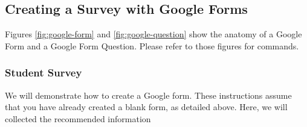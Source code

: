 \subsection{Creating a Survey with Google Forms}
Figures \ref{fig:google-form} and \ref{fig:google-question} show the anatomy of a Google Form and a Google Form Question.  Please refer to those figures for commands.


%
%
\subsubsection{Student Survey}

We will demonstrate how to create a Google form.  These instructions assume that you have already created a blank form, as detailed above.  Here, we will collected the recommended information

